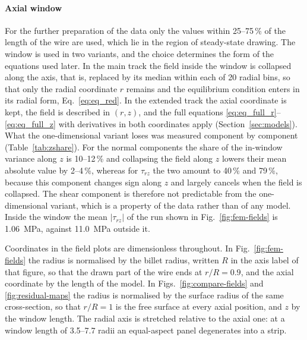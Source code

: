 \documentclass[pdflatex,sn-basic,Numbered]{sn-jnl}
\begin{document}
\paragraph{Axial window}
For the further preparation of the data only the values within 25--75\,\% of the length of the wire are used, which lie in the region of steady-state drawing.
The window is used in two variants, and the choice determines the form of the equations used later. In the main track the field inside the window is collapsed along the axis, that is, replaced by its median within each of 20 radial bins, so that only the radial coordinate $r$ remains and the equilibrium condition enters in its radial form, Eq.~\eqref{eq:eq_red}. In the extended track the axial coordinate is kept, the field is described in $(r,z)$, and the full equations \eqref{eq:eq_full_r}--\eqref{eq:eq_full_z} with derivatives in both coordinates apply (Section~\ref{sec:models}). What the one-dimensional variant loses was measured component by component (Table~\ref{tab:zshare}). For the normal components the share of the in-window variance along $z$ is 10--12\,\% and collapsing the field along $z$ lowers their mean absolute value by 2--4\,\%, whereas for $\tau_{rz}$ the two amount to 40\,\% and 79\,\%, because this component changes sign along $z$ and largely cancels when the field is collapsed.
The shear component is therefore not predictable from the one-dimensional variant, which is a property of the data rather than of any model. Inside the window the mean $|\tau_{rz}|$ of the run shown in Fig.~\ref{fig:fem-fields} is 1.06~MPa, against 11.0~MPa outside it.

Coordinates in the field plots are dimensionless throughout. In Fig.~\ref{fig:fem-fields} the radius is normalised by the billet radius, written $R$ in the axis label of that figure, so that the drawn part of the wire ends at $r/R = 0.9$, and the axial coordinate by the length of the model.
In Figs.~\ref{fig:compare-fields} and \ref{fig:residual-maps} the radius is normalised by the surface radius of the same cross-section, so that $r/R = 1$ is the free surface at every axial position, and $z$ by the window length.
The radial axis is stretched relative to the axial one: at a window length of 3.5--7.7 radii an equal-aspect panel degenerates into a strip.
\end{document}

